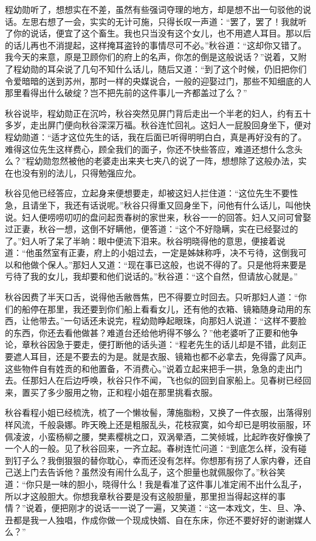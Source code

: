 \documentclass[12pt,UTF8]{ctexbook}
\begin{document}
{{{程幼勋听了，想想实在不差，虽然有些强词夺理的地方，却是想不出一句驳他的说话。左思右想了一会，实实的无计可施，只得长叹一声道：“罢了，罢了！我就听了你的说话，便宜了这个畜生。我也只当没有这个女儿，也不用遮人耳目。那以后的话儿再也不消提起，这样掩耳盗铃的事情尽可不必。”秋谷道：“这却你又错了。我今天的来意，原是卫顾你们的府上的名声，你怎的倒是这般说话？”说着，又附了程幼勋的耳朵说了几句不知什么话儿，随后又道：“到了这个时候，仍旧把你们令爱暗暗的送到苏州，那时一样的央媒说合，一般的迎娶过门，那些不知细底的人那里看得出什么破绽？岂不把先前的这件事儿一齐都盖过了么？”

秋谷说毕，程幼勋正在沉吟，秋谷突然见屏门背后走出一个半老的妇人，约有五十多岁，走出屏门便向秋谷深深万福。秋谷连忙回礼。这妇人一屁股回身坐下，便对程幼勋道：“适才这位先生的话，我在后面已听得明明白白，真是再好没有的了。难得这位先生这样费心，顾全我们的面子，你还不快些答应，难道还想什么念头么？”程幼勋忽然被他的老婆走出来夹七夹八的说了一阵，想想除了这般办法，实在也没有别的法儿，只得勉强应允。

秋谷见他已经答应，立起身来便想要走，却被这妇人拦住道：“这位先生不要性急，且请坐下，我还有话说呢。”秋谷只得重又回身坐下，问他有什么话儿，叫他快说。妇人便唠唠叨叨的盘问起贡春树的家世来，秋谷一一的回答。妇人又问可曾娶过正妻，秋谷一想，这倒不好瞒他，便答道：“这个不好隐瞒，实在已经娶过的了。”妇人听了呆了半晌：眼中便流下泪来。秋谷明晓得他的意思，便接着说道：“他虽然室有正妻，府上的小姐过去，一定是姊妹称呼，决不亏待，这倒我可以和他做个保人。”那妇人又道：“现在事已这般，也说不得的了。只是他将来要是亏待了我的女儿，我却要和他们说话的。”秋谷道：“这个自然，但请放心就是。”

秋谷因费了半天口舌，说得他舌敝唇焦，巴不得要立时回去。只听那妇人道：“你们的船停在那里，我还要到你们船上看看女儿，还有他的衣箱、镜箱随身动用的东西，让他带去。”一句话还未说完，程幼勋睁起眼珠，向那妇人说道：“这样不要脸的东西，你还去看他做甚？难道台还给他坍得不够么？”他老婆听了正要和他争论，章秋谷因急于要走，便打断他的话头道：“程老先生的话儿却是不错，此刻正要遮人耳目，还是不要去的为是。就是衣服、镜箱也都不必拿去，免得露了风声。这些物件自有姓贡的和他置备，不消费心。”说着立起来把手一拱，急急的走出门去。任那妇人在后边呼唤，秋谷只作不闻，飞也似的回到自家船上。见春树已经回来，置买了多少服用之物，正和程小姐在那里挑看衣服。

秋谷看程小姐已经梳洗，梳了一个懒妆髻，薄施脂粉，又换了一件衣服，出落得别样风流，千般袅娜。昨天晚上还是粗服乱头，花枝寂寞，如今却已是明妆丽服，环佩凌波，小蛮杨柳之腰，樊素樱桃之口，双涡晕酒，二笑倾城，比起昨夜好像换了一个人的一般。见了秋谷回来，一齐立起。春树连忙问道：“到底怎么样，没有碰到钉子么？我倒狠狠的替你耽心，幸而还没有怎样。你想那有拐了人家内眷，还自己送上门去告诉他？虽然没有闹什么乱子，这个胆量也就佩服你了。”秋谷笑道：“你只是一味的胆小，晓得什么！我是看准了这件事儿准定闹不出什么乱子，所以才这般胆大。你想我章秋谷要是没有这般胆量，那里担当得起这样的事情？”说着，便把刚才的说话一一说了一遍，又笑道：“这一本戏文，生、旦、净、丑都是我一人独唱，作成你做一个现成快婿、自在东床，你还不要好好的谢谢媒人么？”

}}}
\end{document}
